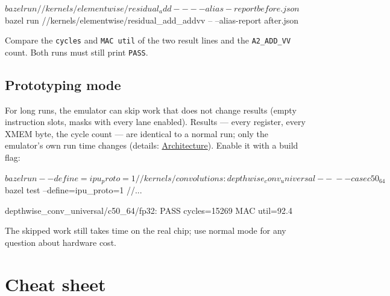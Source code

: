 \documentclass[11pt,a4paper]{article}
\newcommand{\doc}[2]{\href{https://rechefe.github.io/ipu-emulator/dev/#1/}{\textcolor{accent}{#2}}}
\begin{document}
\begin{termcmd}
$ bazel run //kernels/elementwise/residual_add       -- --alias-report before.json
$ bazel run //kernels/elementwise/residual_add_addvv -- --alias-report after.json
\end{termcmd}

Compare the \texttt{cycles} and \texttt{MAC util} of the two result lines
and the \texttt{A2\_ADD\_VV} count. Both runs must still print \texttt{PASS}.

\subsection{Prototyping mode}

For long runs, the emulator can skip work that does not change results (empty
\needspace{5.9cm}
instruction slots, masks with every lane enabled). Results --- every register,
every XMEM byte, the cycle count --- are identical to a normal run; only the
emulator's own run time changes (details: \doc{explanation/architecture}{Architecture}).
Enable it with a build flag:

\begin{termcmdtop}
$ bazel run --define=ipu_proto=1 //kernels/convolutions:depthwise_conv_universal -- \
    --case c50_64
$ bazel test --define=ipu_proto=1 //...
\end{termcmdtop}
\begin{termout}
depthwise_conv_universal/c50_64/fp32: PASS  cycles=15269  MAC util=92.4%
\end{termout}

The skipped work still takes time on the real chip; use normal mode for any
question about hardware cost.

\appendix
\section{Cheat sheet}
\end{document}
